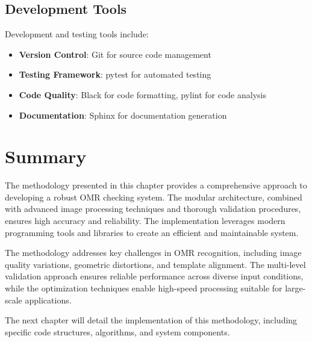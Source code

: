 \subsection{Development Tools}

Development and testing tools include:

\begin{itemize}
\item \textbf{Version Control}: Git for source code management
\item \textbf{Testing Framework}: pytest for automated testing
\item \textbf{Code Quality}: Black for code formatting, pylint for code analysis
\item \textbf{Documentation}: Sphinx for documentation generation
\end{itemize}

\section{Summary}

The methodology presented in this chapter provides a comprehensive approach to developing a robust OMR checking system. The modular architecture, combined with advanced image processing techniques and thorough validation procedures, ensures high accuracy and reliability. The implementation leverages modern programming tools and libraries to create an efficient and maintainable system.

The methodology addresses key challenges in OMR recognition, including image quality variations, geometric distortions, and template alignment. The multi-level validation approach ensures reliable performance across diverse input conditions, while the optimization techniques enable high-speed processing suitable for large-scale applications.

The next chapter will detail the implementation of this methodology, including specific code structures, algorithms, and system components.